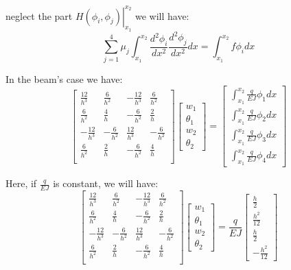 neglect the part $\left.H(\phi_i,\phi_j)\right|_{x_1}^{x_2}$ we will have:
\begin{equation}
    \sum_{j=1}^4
    \mu_j
    \int_{x_1}^{x_2}
    \frac{d^2\phi_i}{dx^2}
    \frac{d^2\phi_j}{dx^2}
    dx
    =
    \int_{x_1}^{x_2}
    f\phi_i
    dx
\end{equation}

In the beam's case we have:
\begin{equation}
\begin{bmatrix}
 \frac{12}{h^3} & \frac{6}{h^2} & -\frac{12}{h^3} & \frac{6}{h^2} \\
 \frac{6}{h^2} & \frac{4}{h} & -\frac{6}{h^2} & \frac{2}{h} \\
 -\frac{12}{h^3} & -\frac{6}{h^2} & \frac{12}{h^3} & -\frac{6}{h^2} \\
 \frac{6}{h^2} & \frac{2}{h} & -\frac{6}{h^2} & \frac{4}{h} \\
\end{bmatrix}
\begin{bmatrix}
    w_1\\ \theta_1\\ w_2\\ \theta_2
\end{bmatrix}
=
\begin{bmatrix}
    \int_{x_1}^{x_2} \frac{q}{EJ}\phi_1 dx\\
    \int_{x_1}^{x_2} \frac{q}{EJ}\phi_2 dx\\
    \int_{x_1}^{x_2} \frac{q}{EJ}\phi_3 dx\\
    \int_{x_1}^{x_2} \frac{q}{EJ}\phi_4 dx
\end{bmatrix}
\end{equation}

Here, if $\frac{q}{EJ}$ is constant, we will have:
\begin{equation}
    \begin{bmatrix}
        \frac{12}{h^3} & \frac{6}{h^2} & -\frac{12}{h^3} & \frac{6}{h^2} \\
        \frac{6}{h^2} & \frac{4}{h} & -\frac{6}{h^2} & \frac{2}{h} \\
        -\frac{12}{h^3} & -\frac{6}{h^2} & \frac{12}{h^3} & -\frac{6}{h^2} \\
        \frac{6}{h^2} & \frac{2}{h} & -\frac{6}{h^2} & \frac{4}{h} \\
       \end{bmatrix}
       \begin{bmatrix}
           w_1\\ \theta_1\\ w_2\\ \theta_2
       \end{bmatrix}
       =
       \frac{q}{EJ}
       \begin{bmatrix}
       \frac{h}{2}\\
       \frac{h^2}{12}\\
       \frac{h}{2}\\
       -\frac{h^2}{12}
       \end{bmatrix}
\end{equation}

